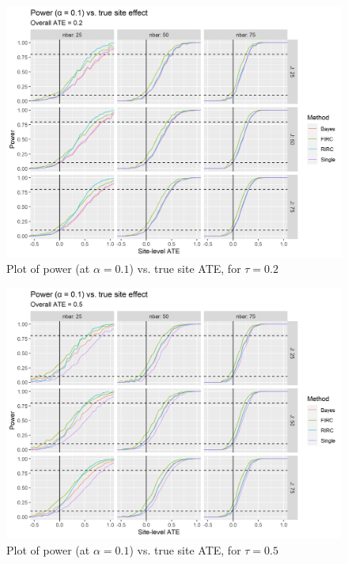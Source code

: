 \documentclass[]{article}
\begin{document}
\begin{figure}[ht]
	\centering
	\includegraphics[width=\textwidth]{power_plot_2}
	\caption{Plot of power (at $\alpha = 0.1$) vs. true site ATE, for $\tau = 0.2$}
	\label{fig:power_plot2}
\end{figure}

\begin{figure}[ht]
	\centering
	\includegraphics[width=\textwidth]{power_plot_5}
	\caption{Plot of power (at $\alpha = 0.1$) vs. true site ATE, for $\tau = 0.5$}
	\label{fig:power_plot5}
\end{figure}
\end{document}
